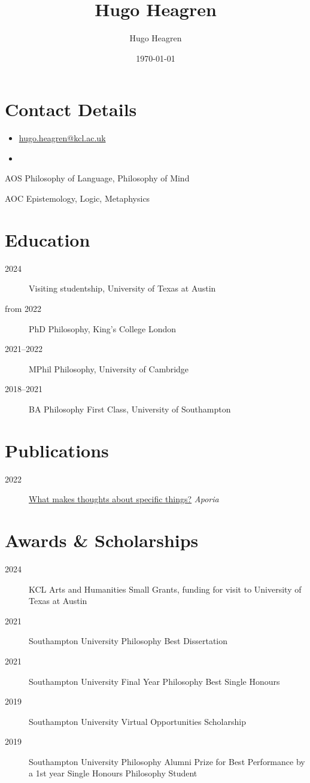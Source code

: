 \documentclass{cv}
\author{Hugo Heagren}
\date{\today}
\title{Hugo Heagren}
\begin{document}
\maketitle
\nocite{*}

\section*{Contact Details}
\begin{itemize}
\item \href{mailto:hugo.heagren@kcl.ac.uk}{hugo.heagren@kcl.ac.uk}
\item {}
\end{itemize}

\begin{areas}
\item[{AOS}] Philosophy of Language, Philosophy of Mind
\item[{AOC}] Epistemology, Logic, Metaphysics
\end{areas}

\section*{Education}
\begin{description}
\item[{2024}] Visiting studentship, University of Texas at Austin
\item[{from 2022}] PhD Philosophy, King's College London
\item[{2021--2022}] MPhil Philosophy, University of Cambridge
\item[{2018--2021}] BA Philosophy First Class, University of Southampton
\end{description}

\section*{Publications}
\begin{description}
\item[{2022}] \href{https://ojs.st-andrews.ac.uk/index.php/aporia/article/view/2451}{What makes thoughts about specific things?} \emph{Aporia}
\end{description}

\section*{Awards \& Scholarships}
\begin{description}
\item[{2024}] KCL Arts and Humanities Small Grants, funding for visit to
University of Texas at Austin
\item[{2021}] Southampton University Philosophy Best Dissertation
\item[{2021}] Southampton University Final Year Philosophy Best Single
Honours
\item[{2019}] Southampton University Virtual Opportunities Scholarship
\item[{2019}] Southampton University Philosophy Alumni Prize for Best
Performance by a 1st year Single Honours Philosophy Student
\end{description}
\end{document}
